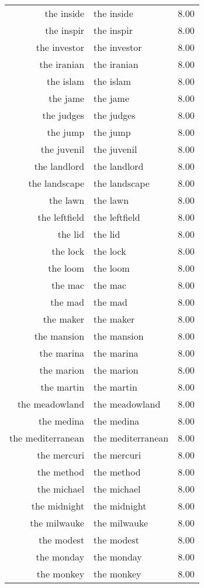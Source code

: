 \begin{table}[ht]
\begin{tabular}{rlr}
  the inside & the inside & 8.00 \\ 
  the inspir & the inspir & 8.00 \\ 
  the investor & the investor & 8.00 \\ 
  the iranian & the iranian & 8.00 \\ 
  the islam & the islam & 8.00 \\ 
  the jame & the jame & 8.00 \\ 
  the judges & the judges & 8.00 \\ 
  the jump & the jump & 8.00 \\ 
  the juvenil & the juvenil & 8.00 \\ 
  the landlord & the landlord & 8.00 \\ 
  the landscape & the landscape & 8.00 \\ 
  the lawn & the lawn & 8.00 \\ 
  the leftfield & the leftfield & 8.00 \\ 
  the lid & the lid & 8.00 \\ 
  the lock & the lock & 8.00 \\ 
  the loom & the loom & 8.00 \\ 
  the mac & the mac & 8.00 \\ 
  the mad & the mad & 8.00 \\ 
  the maker & the maker & 8.00 \\ 
  the mansion & the mansion & 8.00 \\ 
  the marina & the marina & 8.00 \\ 
  the marion & the marion & 8.00 \\ 
  the martin & the martin & 8.00 \\ 
  the meadowland & the meadowland & 8.00 \\ 
  the medina & the medina & 8.00 \\ 
  the mediterranean & the mediterranean & 8.00 \\ 
  the mercuri & the mercuri & 8.00 \\ 
  the method & the method & 8.00 \\ 
  the michael & the michael & 8.00 \\ 
  the midnight & the midnight & 8.00 \\ 
  the milwauke & the milwauke & 8.00 \\ 
  the modest & the modest & 8.00 \\ 
  the monday & the monday & 8.00 \\ 
  the monkey & the monkey & 8.00 \\ 

\end{tabular}
\end{table}
